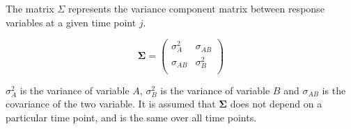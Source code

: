 \documentclass[12pt, a4paper]{report}
\theoremstyle{plain}
\theoremstyle{definition}
\theoremstyle{remark}
\begin{document}
	The matrix $\Sigma$ represents the variance component matrix between response variables at a given time point $j$.
	
	\[
	\boldsymbol{\Sigma} = \left( \begin{array}{cc}
	\sigma^2_{A} & \sigma_{AB} \\
	\sigma_{AB} & \sigma^2_{B}\\
	\end{array}   \right)
	\]
	
	$\sigma^2_{A}$ is the variance of variable $A$, $\sigma^2_{B}$ is the variance of variable $B$ and $\sigma_{AB}$ is the covariance of the two variable. It is assumed that $\boldsymbol{\Sigma}$ does not depend on a particular time point, and is the same over all time points.
	
	
	
	
	
	
	
	
	
	
	
	
	
	
\end{document}
